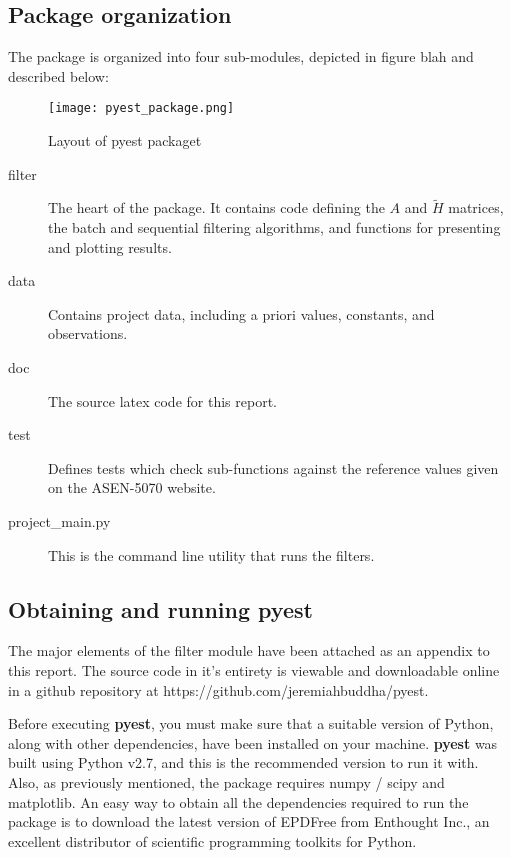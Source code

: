 \documentclass[10pt]{article}
\begin{document}
\subsection{Package organization}
The package is organized into four sub-modules, depicted in figure blah and described below:

\begin{figure}[htbp]
\begin{center}
\texttt{[image: pyest\_package.png]}
\caption{Layout of pyest packaget}
\end{center}
\end{figure}

\begin{description}
\item[filter] The heart of the package. It contains code defining the $A$ and $\tilde{H}$ matrices, the batch and sequential filtering algorithms, and functions for presenting and plotting results.
\item[data] Contains project data, including a priori values, constants, and observations.
\item[doc] The source latex code for this report.
\item[test] Defines tests which check sub-functions against the reference values given on the ASEN-5070 website.
\item[project\_main.py] This is the command line utility that runs the filters.
\end{description}

\subsection{Obtaining and running \textbf{pyest}}

The major elements of the filter module have been attached as an appendix to this report. The source code in it's entirety is viewable and downloadable online in a github repository at https://github.com/jeremiahbuddha/pyest. 

Before executing \textbf{pyest}, you must make sure that a suitable version of Python, along with other dependencies, have been installed on your machine. \textbf{pyest} was built using Python v2.7, and this is the recommended version to run it with. Also, as previously mentioned, the package requires numpy / scipy and matplotlib. An easy way to obtain all the dependencies required to run the package is to download the latest version of EPDFree from Enthought Inc., an excellent distributor of scientific programming toolkits for Python.
\end{document}
